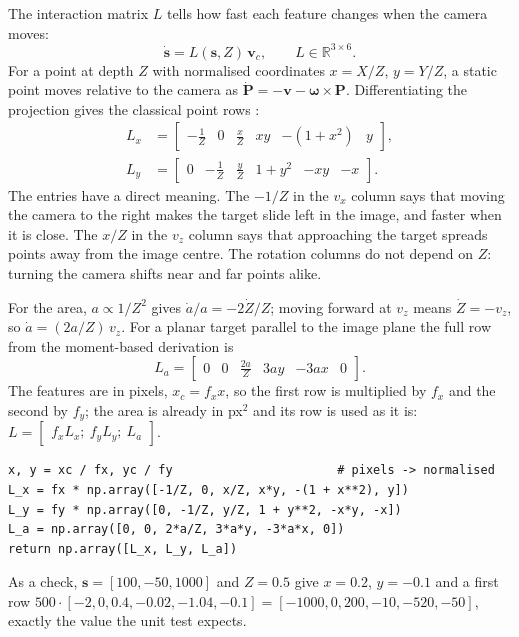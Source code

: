 \documentclass[11pt,a4paper]{article}
\newcommand{\vect}[1]{\bm{#1}}
\begin{document}
The interaction matrix $L$ tells how fast each feature changes when the camera moves:
\begin{equation}
  \dot{\vect{s}}=L(\vect{s},Z)\,\vect{v}_c,\qquad L\in\mathbb{R}^{3\times6}.
\end{equation}
For a point at depth $Z$ with normalised coordinates $x=X/Z$, $y=Y/Z$, a static point moves relative
to the camera as $\dot{\vect P}=-\vect v-\vect\omega\times\vect P$. Differentiating the projection gives
the classical point rows \cite{chaumette2006}:
\begin{align}
  L_x&=\begin{bmatrix}-\tfrac1Z & 0 & \tfrac xZ & xy & -(1+x^{2}) & y\end{bmatrix},\\
  L_y&=\begin{bmatrix}0 & -\tfrac1Z & \tfrac yZ & 1+y^{2} & -xy & -x\end{bmatrix}.
\end{align}
The entries have a direct meaning. The $-1/Z$ in the $v_x$ column says that moving the camera to the
right makes the target slide left in the image, and faster when it is close. The $x/Z$ in the $v_z$
column says that approaching the target spreads points away from the image centre. The rotation
columns do not depend on $Z$: turning the camera shifts near and far points alike.

For the area, $a\propto1/Z^{2}$ gives $\dot a/a=-2\dot Z/Z$; moving forward at $v_z$ means
$\dot Z=-v_z$, so $\dot a=(2a/Z)\,v_z$. For a planar target parallel to the image plane the full row
from the moment-based derivation \cite{chaumette2004} is
\begin{equation}
  L_a=\begin{bmatrix}0 & 0 & \tfrac{2a}{Z} & 3ay & -3ax & 0\end{bmatrix}.
\end{equation}
The features are in pixels, $x_c=f_x x$, so the first row is multiplied by $f_x$ and the second by
$f_y$; the area is already in px$^{2}$ and its row is used as it is:
$L=\begin{bmatrix}f_xL_x;\ f_yL_y;\ L_a\end{bmatrix}$.
\begin{lstlisting}
x, y = xc / fx, yc / fy                       # pixels -> normalised
L_x = fx * np.array([-1/Z, 0, x/Z, x*y, -(1 + x**2), y])
L_y = fy * np.array([0, -1/Z, y/Z, 1 + y**2, -x*y, -x])
L_a = np.array([0, 0, 2*a/Z, 3*a*y, -3*a*x, 0])
return np.array([L_x, L_y, L_a])
\end{lstlisting}
As a check, $\vect s=[100,-50,1000]$ and $Z=0.5$ give $x=0.2$, $y=-0.1$ and a first row
$500\cdot[-2,0,0.4,-0.02,-1.04,-0.1]=[-1000,0,200,-10,-520,-50]$, exactly the value the unit test
expects.
\end{document}
